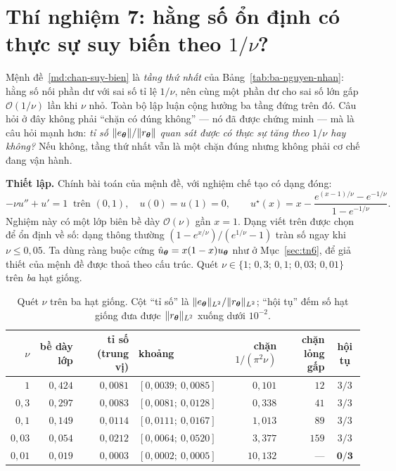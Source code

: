 \section{Thí nghiệm 7: hằng số ổn định có thực sự suy biến theo $1/\nu$?}
\label{sec:tn7}

\begin{thinghiem}
\label{tn:nu}
Mệnh đề~\ref{md:chan-suy-bien} là \emph{tầng thứ nhất} của
Bảng~\ref{tab:ba-nguyen-nhan}: hằng số nối phần dư với sai số tỉ lệ $1/\nu$, nên
cùng một phần dư cho sai số lớn gấp $\mathcal{O}(1/\nu)$ lần khi $\nu$ nhỏ. Toàn
bộ lập luận cộng hưởng ba tầng đứng trên đó. Câu hỏi ở đây không phải ``chặn có
đúng không'' --- nó đã được chứng minh --- mà là câu hỏi mạnh hơn:
\emph{tỉ số $\lVert e_{\bm{\theta}}\rVert/\lVert r_{\bm{\theta}}\rVert$ quan sát được có thực sự tăng
theo $1/\nu$ hay không?} Nếu không, tầng thứ nhất vẫn là một chặn đúng nhưng
không phải cơ chế đang vận hành.
\end{thinghiem}

\textbf{Thiết lập.} Chính bài toán của mệnh đề, với nghiệm chế tạo có dạng đóng:
\begin{equation}
-\nu u'' + u' = 1 \ \text{ trên } (0,1), \quad u(0)=u(1)=0,
\qquad
u^{\star}(x) = x - \frac{e^{(x-1)/\nu} - e^{-1/\nu}}{1 - e^{-1/\nu}} .
\label{eq:tn7-nghiem}
\end{equation}
Nghiệm này có một lớp biên bề dày $\mathcal{O}(\nu)$ gần $x=1$. Dạng viết trên
được chọn để ổn định về số: dạng thông thường $(1-e^{x/\nu})/(e^{1/\nu}-1)$ tràn
số ngay khi $\nu \le 0{,}05$. Ta dùng ràng buộc cứng
$\hat u_{\bm{\theta}} = x(1-x)u_{\bm{\theta}}$ như ở Mục~\ref{sec:tn6}, để giả thiết của
mệnh đề được thoả theo cấu trúc. Quét $\nu \in \{1;\,0{,}3;\,0{,}1;\,0{,}03;\,
0{,}01\}$ trên \emph{ba} hạt giống.

\begin{table}[H]
\centering
\caption[Quét $\nu$ cho bài toán đối lưu--khuếch tán]{Quét $\nu$ trên ba hạt
giống. Cột ``tỉ số'' là $\lVert e_{\bm{\theta}}\rVert_{L^2}/\lVert r_{\bm{\theta}}\rVert_{L^2}$;
``hội tụ'' đếm số hạt giống đưa được $\lVert r_{\bm{\theta}}\rVert_{L^2}$ xuống dưới
$10^{-2}$.}
\label{tab:tn7}
\small
\setlength{\tabcolsep}{4pt}
\begin{tabular}{@{}r r r l r r c@{}}
\toprule
$\nu$ & bề dày lớp & tỉ số (trung vị) & khoảng & chặn $1/(\pi^2\nu)$
& chặn lỏng gấp & hội tụ \\
\midrule
$1$      & $0{,}424$ & $0{,}0081$ & $[0{,}0039;\ 0{,}0085]$ & $0{,}101$ & $12$  & $3/3$ \\
$0{,}3$  & $0{,}297$ & $0{,}0083$ & $[0{,}0081;\ 0{,}0128]$ & $0{,}338$ & $41$  & $3/3$ \\
$0{,}1$  & $0{,}149$ & $0{,}0114$ & $[0{,}0111;\ 0{,}0167]$ & $1{,}013$ & $89$  & $3/3$ \\
$0{,}03$ & $0{,}054$ & $0{,}0212$ & $[0{,}0064;\ 0{,}0520]$ & $3{,}377$ & $159$ & $3/3$ \\
$0{,}01$ & $0{,}019$ & $0{,}0003$ & $[0{,}0002;\ 0{,}0005]$ & $10{,}132$& ---   & $\mathbf{0/3}$ \\
\bottomrule
\end{tabular}
\end{table}

